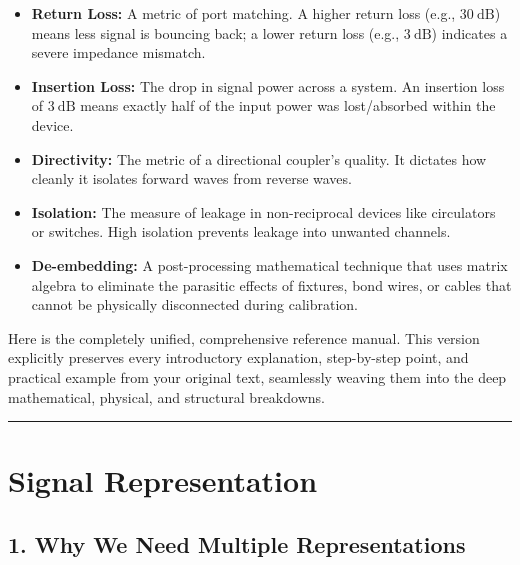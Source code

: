 \documentclass[
]{article}
\providecommand{\tightlist}{%
  \setlength{\itemsep}{0pt}\setlength{\parskip}{0pt}}
\begin{document}
\begin{itemize}
\tightlist
\item
  \textbf{Return Loss:} A metric of port matching. A higher return loss
  (e.g., \(30\ \text{dB}\)) means less signal is bouncing back; a lower
  return loss (e.g., \(3\ \text{dB}\)) indicates a severe impedance
  mismatch.
\item
  \textbf{Insertion Loss:} The drop in signal power across a system. An
  insertion loss of \(3\ \text{dB}\) means exactly half of the input
  power was lost/absorbed within the device.
\item
  \textbf{Directivity:} The metric of a directional coupler's quality.
  It dictates how cleanly it isolates forward waves from reverse waves.
\item
  \textbf{Isolation:} The measure of leakage in non-reciprocal devices
  like circulators or switches. High isolation prevents leakage into
  unwanted channels.
\item
  \textbf{De-embedding:} A post-processing mathematical technique that
  uses matrix algebra to eliminate the parasitic effects of fixtures,
  bond wires, or cables that cannot be physically disconnected during
  calibration.
\end{itemize}

Here is the completely unified, comprehensive reference manual. This
version explicitly preserves every introductory explanation,
step-by-step point, and practical example from your original text,
seamlessly weaving them into the deep mathematical, physical, and
structural breakdowns.

\begin{center}\rule{0.5\linewidth}{0.5pt}\end{center}

\section{Signal Representation}\label{signal-representation}

\subsection{1. Why We Need Multiple
Representations}\label{why-we-need-multiple-representations}
\end{document}
